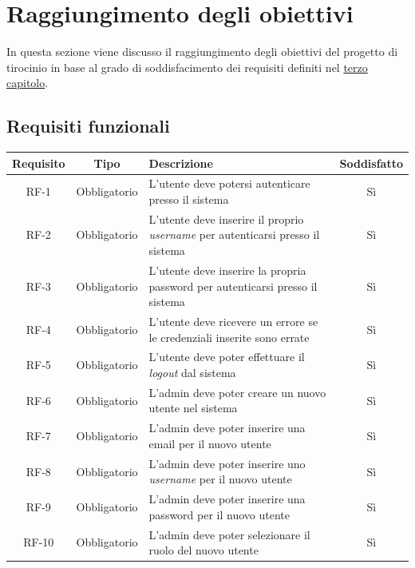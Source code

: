 \section{Raggiungimento degli obiettivi}
In questa sezione viene discusso il raggiungimento degli obiettivi 
del progetto di tirocinio in base al grado di soddisfacimento 
dei requisiti definiti nel \hyperref[cap:analisi-requisiti]{terzo capitolo}.

\subsection{Requisiti funzionali}
\begingroup
\renewcommand{\arraystretch}{1.50}
\begin{center}
    \begin{xltabular}{\textwidth}{|c|c| >{\arraybackslash}X|c|}
        \hline
        \textbf{Requisito} & \textbf{Tipo} & \textbf{Descrizione} & \textbf{Soddisfatto} \\
        \hline
        \endhead
        RF-1 & Obbligatorio & L'utente deve potersi autenticare presso il sistema & Sì \\
        \hline
        RF-2 & Obbligatorio & L'utente deve inserire il proprio \textit{username} per autenticarsi presso il sistema & Sì \\
        \hline
        RF-3 & Obbligatorio & L'utente deve inserire la propria password per autenticarsi presso il sistema & Sì \\
        \hline
        RF-4 & Obbligatorio & L'utente deve ricevere un errore se le credenziali inserite sono errate & Sì \\
        \hline
        RF-5 & Obbligatorio & L'utente deve poter effettuare il \textit{logout} dal sistema & Sì \\
        \hline
        RF-6 & Obbligatorio & L'admin deve poter creare un nuovo utente nel sistema & Sì \\
        \hline
        RF-7 & Obbligatorio & L'admin deve poter inserire una email per il nuovo utente & Sì \\
        \hline
        RF-8 & Obbligatorio & L'admin deve poter inserire uno \textit{username} per il nuovo utente & Sì \\
        \hline
        RF-9 & Obbligatorio & L'admin deve poter inserire una password per il nuovo utente & Sì \\
        \hline
        RF-10 & Obbligatorio & L'admin deve poter selezionare il ruolo del nuovo utente & Sì \\

\end{xltabular}
\end{center}
